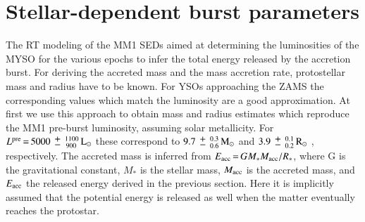 \section{Stellar-dependent burst parameters}\label{sbp}
The RT modeling of the MM1 SEDs aimed at determining the luminosities of the MYSO for the various epochs to infer the total energy released by the accretion burst.
For deriving the accreted mass and the mass accretion rate, protostellar mass and radius have to be known. For YSOs approaching the ZAMS the corresponding values which match the  luminosity are a good approximation. At first we use this approach to obtain mass and radius estimates
which reproduce the MM1 pre-burst luminosity, assuming solar metallicity. For
$L^{\rm pre}\,{=}\,5000\,{\mypm}\, _{\,900}^{1100} \,{\rm L}_\odot$
these correspond to 
$9.7\,{\mypm}\,_{0.6}^{0.3}\,{\rm M}_\odot$ and $3.9\,{\mypm}\,_{0.2}^{0.1}\,{\rm R}_\odot$
\citep{1996MNRAS.281..257T}, respectively.
The accreted mass is inferred from $E_{\rm acc}\,{=}\,GM_*M_{\rm acc}/R_*$, where G is the gravitational constant, $M_*$ is 
the stellar mass, $M_{\rm acc}$ is the accreted mass, and $E_{\rm acc}$ the released energy derived %
in the previous section. Here it is implicitly assumed that the potential energy is released as well when the matter eventually reaches the protostar.

